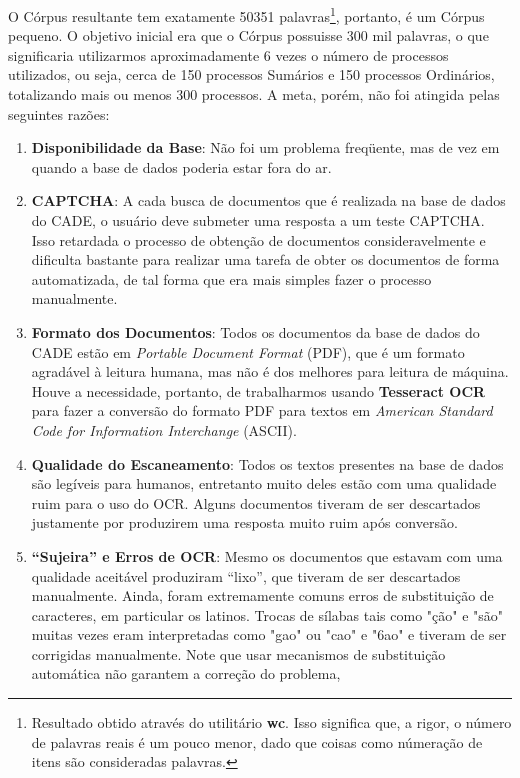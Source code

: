 \documentclass[11pt]{report}
\newcommand{\quotes}[1]{``#1''}
\begin{document}
O Córpus resultante tem exatamente 50351 palavras\footnote[8]{Resultado obtido através do utilitário \textbf{wc}. Isso significa que, a rigor, o número de palavras
reais é um pouco menor, dado que coisas como númeração de itens são consideradas palavras.}, portanto, é um Córpus pequeno. O objetivo inicial era que o Córpus
possuisse 300 mil palavras, o que significaria utilizarmos aproximadamente 6 vezes o número de processos utilizados, ou seja, cerca de 150 processos Sumários e
150 processos Ordinários, totalizando mais ou menos 300 processos. A meta, porém, não foi atingida pelas seguintes razões:

\begin{enumerate}[label=\textbf{\arabic*.}]
  \item \textbf{Disponibilidade da Base}: Não foi um problema freqüente, mas de vez em quando a base de dados poderia estar fora do ar.
  \item \textbf{CAPTCHA}: A cada busca de documentos que é realizada na base de dados do CADE, o usuário deve submeter uma resposta a um teste CAPTCHA. Isso
  retardada o processo de obtenção de documentos consideravelmente e dificulta bastante para realizar uma tarefa de obter os documentos de forma automatizada, de tal
  forma que era mais simples fazer o processo manualmente.
  \item \textbf{Formato dos Documentos}: Todos os documentos da base de dados do CADE estão em \textit{Portable Document Format} (PDF), que é um formato agradável à
  leitura humana, mas não é dos melhores para leitura de máquina. Houve a necessidade, portanto,  de trabalharmos usando \textbf{Tesseract OCR} para fazer a conversão do
  formato PDF para textos em \textit{American Standard Code for Information Interchange} (ASCII).
  \item \textbf{Qualidade do Escaneamento}: Todos os textos presentes na base de dados são legíveis para humanos, entretanto muito deles estão com uma qualidade ruim para
  o uso do OCR. Alguns documentos tiveram de ser descartados justamente por produzirem uma resposta muito ruim após conversão.
  \item \textbf{\quotes{Sujeira} e Erros de OCR}: Mesmo os documentos que estavam com uma qualidade aceitável produziram \quotes{lixo}, que tiveram de ser descartados
  manualmente. Ainda, foram extremamente comuns erros de substituição de caracteres, em particular os latinos. Trocas de sílabas tais como "ção" e "são" muitas vezes eram
  interpretadas como "gao" ou "cao" e "6ao" e tiveram de ser corrigidas manualmente. Note que usar mecanismos de substituição automática não garantem a correção do problema,

\end{enumerate}
\end{document}
